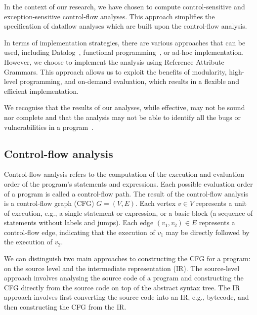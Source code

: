 In the context of our research, we have chosen to compute control-sensitive and
exception-sensitive control-flow analyses. This approach
simplifies the specification of dataflow analyses which are built upon the
control-flow analysis.

In terms of implementation strategies, there are various approaches that can be
used, including Datalog~\cite{dura2021javadl}, functional programming~\cite{madsen2016datalog}, or ad-hoc implementation.
However, we choose to implement the analysis using Reference Attribute Grammars.
This approach allows us to exploit the benefits of modularity, high-level programming,
and on-demand evaluation, which results in a flexible and efficient implementation.

We recognise that the results of our analyses, while effective,
may not be sound nor complete and that the analysis may not be able to identify
all the bugs or vulnerabilities in a program~\cite{livshits2015defense}.





\subsection{Control-flow analysis}
Control-flow analysis refers to the computation of
 the execution and evaluation order of the program's statements and expressions.
Each possible evaluation order of a program is called a control-flow path.
The result of the control-flow analysis is a control-flow graph (CFG) $G=(V,E)$.
Each vertex $v \in V$ represents a unit of execution, e.g., a single statement or expression,
or a basic block (a sequence of statements without labels and jumps).
Each edge $(v_1,v_2) \in E$  represents a control-flow edge, indicating that the
execution of $v_1$ may be directly followed by the execution of $v_2$.

We can distinguish two main approaches to constructing the CFG for a program:
on the source level and the intermediate representation (IR). The source-level approach
involves analysing the source code of a program and constructing the CFG
directly from the source code on top of the abstract syntax tree. The IR approach involves
first converting the source code into an IR, e.g., bytecode,
and then constructing the CFG from the IR.%

